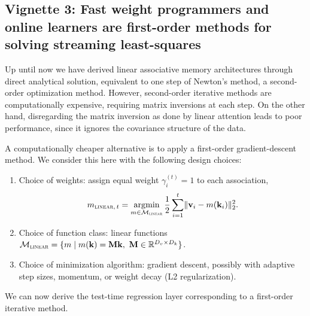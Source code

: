 \documentclass[notitlepage, 11pt]{article}
\newcommand*{\memory}{{m}}
\newcommand*{\dkey}{{D_k}}
\newcommand*{\dval}{{D_v}}
\newcommand*{\linearfunctions}{{\Mcal_{\textsc{linear}}}}
\begin{document}
\subsection*{Vignette 3: Fast weight programmers and online learners are first-order methods for solving streaming least-squares}
Up until now we have derived linear associative memory architectures through direct analytical solution, equivalent to one step of Newton's method, a second-order optimization method.
However, second-order iterative methods are computationally expensive, requiring matrix inversions at each step.
On the other hand, disregarding the matrix inversion as done by linear attention leads to poor performance, since it ignores the covariance structure of the data.

A computationally cheaper alternative is to apply a first-order gradient-descent method. We consider this here with the following design choices:
\begin{enumerate}
    \item Choice of weights: assign equal weight $\gamma_i^{(t)} = 1$ to each association,  \begin{align}\memory_{\textsc{linear},\,t} = \argmin_{\memory\in \linearfunctions} \frac{1}{2}\sum_{i=1}^t \norm{\vbf_i - \memory(\kbf_i)}_2^2.\label{eqn:least-squares-batch-but-online}\end{align}
    \item Choice of function class: linear functions $\linearfunctions = \{\memory\mid \memory(\kbf) = \Mbf \kbf,\ \Mbf \in \reals^{\dval\times\dkey}\}$.
    \item Choice of minimization algorithm: gradient descent, possibly with adaptive step sizes, momentum, or weight decay (L2 regularization).
\end{enumerate}
We can now derive the test-time regression layer corresponding to a first-order iterative method.
\end{document}
